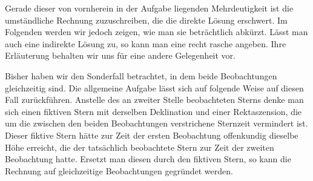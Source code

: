 Gerade dieser von vornherein in der Aufgabe liegenden Mehrdeutigkeit ist die umständliche Rechnung zuzuschreiben, die die direkte Lösung erschwert. Im Folgenden werden wir jedoch zeigen, wie man sie beträchtlich abkürzt. Lässt man auch eine indirekte Lösung zu, so kann man eine recht rasche angeben. Ihre Erläuterung behalten wir uns für eine andere Gelegenheit vor.

Bisher haben wir den Sonderfall betrachtet, in dem beide Beobachtungen gleichzeitig sind. Die allgemeine Aufgabe lässt sich auf folgende Weise auf diesen Fall zurückführen. Anstelle des an zweiter Stelle beobachteten Sterns denke man sich einen fiktiven Stern mit derselben Deklination und einer Rektaszension, die um die zwischen den beiden Beobachtungen verstrichene Sternzeit vermindert ist. Dieser fiktive Stern hätte zur Zeit der ersten Beobachtung offenkundig dieselbe Höhe erreicht, die der tatsächlich beobachtete Stern zur Zeit der zweiten Beobachtung hatte. Ersetzt man diesen durch den fiktiven Stern, so kann die Rechnung auf gleichzeitige Beobachtungen gegründet werden.

